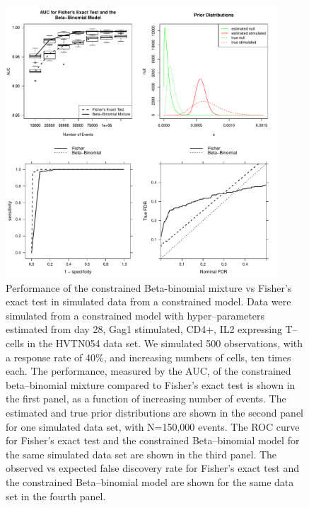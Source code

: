 \documentclass[11pt]{article}
\begin{document}
\begin{figure}[htbp] %
   \centering
   \includegraphics[width=4in]{Figures/simulations} 
   \caption{Performance of the constrained Beta-binomial mixture vs Fisher's exact test in simulated data from a constrained model. Data were simulated from a constrained model with hyper--parameters estimated from day 28, Gag1 stimulated, CD4+, IL2 expressing T--cells in the HVTN054 data set. We simulated 500 observations, with a response rate of 40\%, and increasing numbers of cells, ten times each. The performance, measured by the AUC, of the constrained beta--binomial mixture compared to Fisher's exact test is shown in the first panel, as a function of increasing number of events. The estimated and true prior distributions are shown in the second panel for one simulated data set, with N=150,000 events. The ROC curve for Fisher's exact test and the constrained Beta--binomial model for the same simulated data set are shown in the third panel. The observed vs expected false discovery rate for Fisher's exact test and the constrained Beta--binomial model are shown for the same data set in the fourth panel.}
   \label{fig:simulations}
\end{figure}
\end{document}
